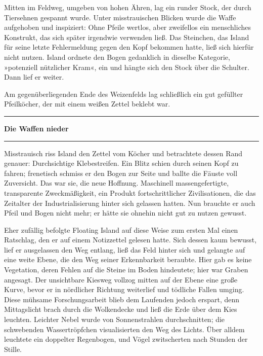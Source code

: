 Mitten im Feldweg, umgeben von hohen Ähren, lag ein runder Stock, der durch Tiersehnen gespannt wurde. Unter misstrauischen Blicken wurde die Waffe aufgehoben und inspiziert: Ohne Pfeile wertlos, aber zweifellos ein menschliches Konstrukt, das sich später irgendwie verwenden ließ. Das Steinchen, das Island für seine letzte Fehlermeldung gegen den Kopf bekommen hatte, ließ sich hierfür nicht nutzen. Island ordnete den Bogen gedanklich in dieselbe Kategorie, »potenziell nützlicher Kram«, ein und hängte sich den Stock über die Schulter. Dann lief er weiter.

Am gegenüberliegenden Ende des Weizenfelds lag schließlich ein gut gefüllter Pfeilköcher, der mit einem weißen Zettel beklebt war.

\noindent \parbox{\textwidth}{ \vspace{3ex} \hrule \vspace{3ex}

\textbf{Die Waffen nieder}


\vspace{3ex} \hrule \vspace{3ex} }

Misstrauisch riss Island den Zettel vom Köcher und betrachtete dessen Rand genauer: Durchsichtige Klebestreifen. Ein Blitz schien durch seinen Kopf zu fahren; frenetisch schmiss er den Bogen zur Seite und ballte die Fäuste voll Zuversicht. Das war sie, die neue Hoffnung. Maschinell massengefertigte, transparente Zweckmäßigkeit, ein Produkt fortschrittlicher Zivilisationen, die das Zeitalter der Industrialisierung hinter sich gelassen hatten. Nun brauchte er auch Pfeil und Bogen nicht mehr; er hätte sie ohnehin nicht gut zu nutzen gewusst.

Eher zufällig befolgte Floating Island auf diese Weise zum ersten Mal einen Ratschlag, den er auf einem Notizzettel gelesen hatte. Sich dessen kaum bewusst, lief er ausgelassen den Weg entlang, ließ das Feld hinter sich und gelangte auf eine weite Ebene, die den Weg seiner Erkennbarkeit beraubte. Hier gab es keine Vegetation, deren Fehlen auf die Steine im Boden hindeutete; hier war Graben angesagt. Der unsichtbare Kiesweg vollzog mitten auf der Ebene eine große Kurve, bevor er in nördlicher Richtung weiterlief und tödliche Fallen umging. Diese mühsame Forschungsarbeit blieb dem Laufenden jedoch erspart, denn Mittagslicht brach durch die Wolkendecke und ließ die Erde über dem Kies leuchten. Leichter Nebel wurde von Sonnenstrahlen durchschnitten; die schwebenden Wassertröpfchen visualisierten den Weg des Lichts. Über alldem leuchtete ein doppelter Regenbogen, und Vögel zwitscherten nach Stunden der Stille.

